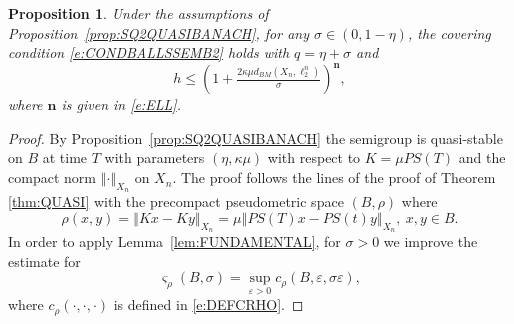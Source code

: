 \documentclass[a4paper,12pt,reqno]{amsart}
\theoremstyle{plain}
\newtheorem{prop}[lem]{Proposition}
\theoremstyle{definition}
\numberwithin{equation}{section}
\newcommand{\norm}[1]{\left\Vert#1\right\Vert}
\newcommand{\eps}{\varepsilon}
\renewcommand{\leq}{\leqslant}
\begin{document}
\begin{prop}\label{prop:QUASISQIMPROVEMENT}
Under the assumptions of Proposition~\ref{prop:SQ2QUASIBANACH}, for any $\sigma\in(0,1-\eta)$, the covering condition \eqref{e:CONDBALLSSEMB2} holds with $q=\eta+\sigma$ and
\begin{equation}\label{e:SQUEEZINGGOOD}
h\leq\left(1+\tfrac{2\kappa\mu d_{BM}(X_n,\ell^n_2)}{\sigma}\right)^{\mathbf{n}},
\end{equation}
where $\mathbf{n}$ is given in \eqref{e:ELL}. 
\end{prop}

\begin{proof}
By Proposition~\ref{prop:SQ2QUASIBANACH} the semigroup is quasi-stable on $B$ at time $T$ with parameters $(\eta,\kappa\mu)$
with respect to $K=\mu PS(T)$ and the compact norm $\norm{\cdot}_{X_n}$ on $X_n$.
The proof follows the lines of the proof of Theorem \ref{thm:QUASI} with the precompact pseudometric space $(B,\rho)$ where
$$\rho(x,y)=\norm{Kx-Ky}_{X_n}=\mu\norm{PS(T)x-PS(t)y}_{X_{n}},\ x,y\in B.$$
In order to apply Lemma~\ref{lem:FUNDAMENTAL}, for $\sigma>0$ we improve the estimate for 
$$\varsigma_{\rho}(B,\sigma)=\sup_{\eps>0}c_{\rho}(B,\eps,\sigma\eps),$$
where $c_{\rho}(\cdot,\cdot,\cdot)$ is defined in \eqref{e:DEFCRHO}.


\end{proof}
\end{document}
